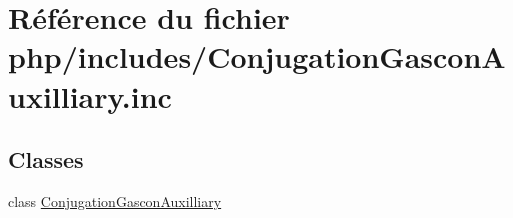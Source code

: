 \hypertarget{_conjugation_gascon_auxilliary_8inc}{}\section{Référence du fichier php/includes/\+Conjugation\+Gascon\+Auxilliary.inc}
\label{_conjugation_gascon_auxilliary_8inc}
\subsection*{Classes}
\begin{DoxyCompactItemize}
\item 
class \hyperlink{class_conjugation_gascon_auxilliary}{Conjugation\+Gascon\+Auxilliary}
\end{DoxyCompactItemize}

